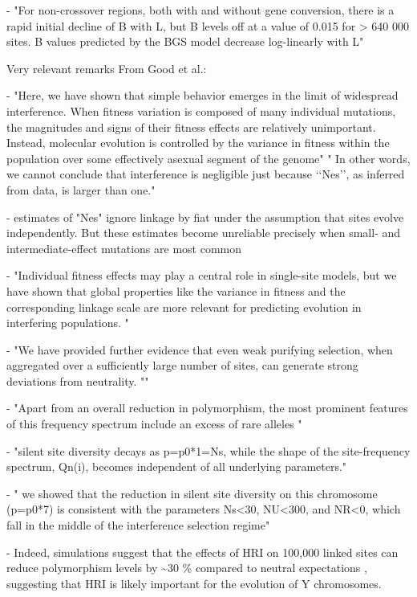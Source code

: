 \documentclass[9pt,twocolumn,twoside]{gsajnl}
\begin{document}
- "For non-crossover regions, both with and without gene conversion, there is a rapid initial decline of B with L, but B levels off at a value of  0.015 for > 640 000 sites. B values predicted by the BGS model decrease log-linearly with L"

Very relevant remarks From Good et al.:

- "Here, we have shown that simple behavior emerges in the limit of widespread interference. When fitness variation is composed of many individual mutations, the magnitudes and signs of their fitness effects are relatively unimportant. Instead, molecular evolution is controlled by the variance in fitness within the population over some effectively asexual segment of the genome" " In other words, we cannot conclude that interference is negligible just because ‘‘Nes’’, as inferred from data, is larger than one."

- estimates of "Nes" ignore linkage by fiat under the assumption that sites evolve independently. But these estimates become unreliable precisely when small- and intermediate-effect mutations are most common

- "Individual fitness effects may play a central role in single-site models, but we have shown that global properties like the variance in fitness and the corresponding linkage scale are more relevant for predicting evolution in interfering populations. "

- "We have provided further evidence that even weak purifying selection, when aggregated over a sufficiently large number of sites, can generate strong deviations from neutrality. ""

- "Apart from an overall reduction in polymorphism, the most prominent features of this frequency spectrum include an excess of rare alleles "

- "silent site diversity decays as p=p0*1=Ns, while the shape of the site-frequency spectrum, Qn(i), becomes independent of all underlying parameters."

- " we showed that the reduction in silent site diversity on this chromosome (p=p0*7) is consistent with the parameters Ns<30, NU<300, and NR<0, which fall in the middle of the interference selection regime"

- Indeed, simulations suggest that the effects of HRI on 100,000 linked sites can reduce polymorphism levels by \textasciitilde 30 \% compared to neutral expectations \citep{mcvean2000}, suggesting that HRI is likely important for the evolution of Y chromosomes.
\end{document}
